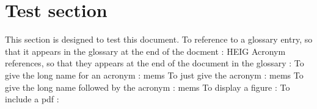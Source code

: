 \section{Test section}
This section is designed to test this document.
\newline
To reference to a glossary entry, so that it appears in the glossary at the end of the docment : \gls{HEIG}
\newline
Acronym references, so that they appears at the end of the document in the glossary :
\newline
To give the long name for an acronym : \acrlong{mems}
\newline
To just give the acronym : \acrshort{mems}
\newline
To give the long name followed by the acronym : \acrfull{mems}
\newline
To display a figure : 
\newline
To include a pdf : 